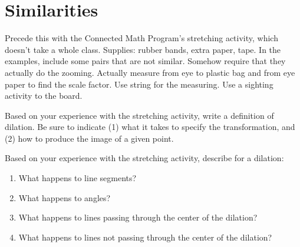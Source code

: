 \newpage

\section{Similarities}
\begin{teachingnote}
Precede this with the Connected Math Program's stretching activity, which doesn't take a whole class.  
Supplies:  rubber bands, extra paper, tape.   
In the examples, include some pairs that are not similar.  Somehow require that they actually do the zooming.  Actually measure from eye to plastic bag and from eye paper to find the scale factor.  Use string for the measuring.  Use a sighting activity to the board.
\end{teachingnote}

\begin{prob}
Based on your experience with the stretching activity, write a definition of dilation.  Be sure to indicate (1) what it takes to specify the transformation, and (2) how to produce the image of a given point.  
\vspace{0.6in}
\end{prob}

\begin{prob}
Based on your experience with the stretching activity, describe for a dilation: 
\begin{enumerate}
\item What happens to line segments? 
\vspace{0.2in}
\item What happens to angles?  
\vspace{0.2in}
\item What happens to lines passing through the center of the dilation?
\vspace{0.2in}
\item What happens to lines not passing through the center of the dilation?
\vspace{0.2in}
\end{enumerate}
\end{prob}


